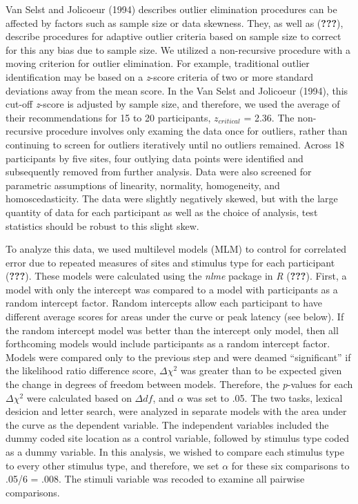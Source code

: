 \documentclass[english,man]{apa6}
\theoremstyle{definition}
\theoremstyle{definition}
\theoremstyle{definition}
\theoremstyle{remark}
\begin{document}
Van Selst and Jolicoeur (1994) describes outlier elimination procedures
can be affected by factors such as sample size or data skewness. They,
as well as ({\textbf{???}}), describe procedures for adaptive outlier
criteria based on sample size to correct for this any bias due to sample
size. We utilized a non-recursive procedure with a moving criterion for
outlier elimination. For example, traditional outlier identification may
be based on a \emph{z}-score criteria of two or more standard deviations
away from the mean score. In the Van Selst and Jolicoeur (1994), this
cut-off \emph{z}-score is adjusted by sample size, and therefore, we
used the average of their recommendations for 15 to 20 participants,
\(z_{critical}\) = 2.36. The non-recursive procedure involves only
examing the data once for outliers, rather than continuing to screen for
outliers iteratively until no outliers remained. Across 18 participants
by five sites, four outlying data points were identified and
subsequently removed from further analysis. Data were also screened for
parametric assumptions of linearity, normality, homogeneity, and
homoscedasticity. The data were slightly negatively skewed, but with the
large quantity of data for each participant as well as the choice of
analysis, test statistics should be robust to this slight skew.

To analyze this data, we used multilevel models (MLM) to control for
correlated error due to repeated measures of sites and stimulus type for
each participant ({\textbf{???}}). These models were calculated using
the \emph{nlme} package in \emph{R} ({\textbf{???}}). First, a model
with only the intercept was compared to a model with participants as a
random intercept factor. Random intercepts allow each participant to
have different average scores for areas under the curve or peak latency
(see below). If the random intercept model was better than the intercept
only model, then all forthcoming models would include participants as a
random intercept factor. Models were compared only to the previous step
and were deamed \enquote{significant} if the likelihood ratio difference
score, \(\Delta\chi^2\) was greater than to be expected given the change
in degrees of freedom between models. Therefore, the \emph{p}-values for
each \(\Delta\chi^2\) were calculated based on \(\Delta df\), and
\(\alpha\) was set to .05. The two tasks, lexical desicion and letter
search, were analyzed in separate models with the area under the curve
as the dependent variable. The independent variables included the dummy
coded site location as a control variable, followed by stimulus type
coded as a dummy variable. In this analysis, we wished to compare each
stimulus type to every other stimulus type, and therefore, we set
\(\alpha\) for these six comparisons to .05/6 = .008. The stimuli
variable was recoded to examine all pairwise comparisons.
\end{document}
